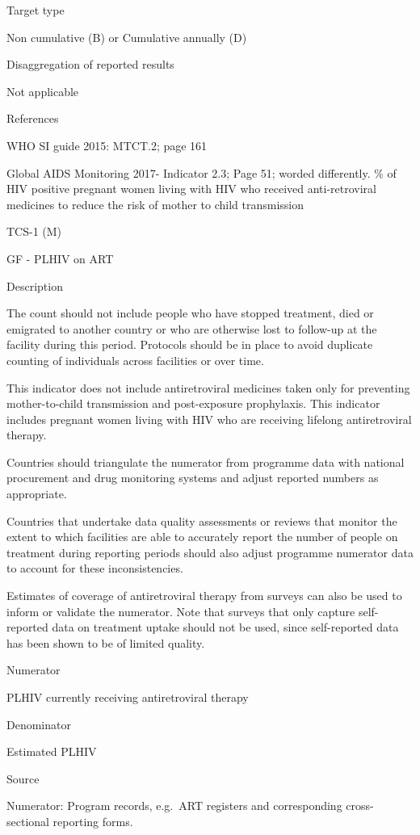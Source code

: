 \documentclass[]{book}
\begin{document}
Target type

Non cumulative (B) or Cumulative annually (D)

Disaggregation of reported results

Not applicable

References

WHO SI guide 2015: MTCT.2; page 161

Global AIDS Monitoring 2017- Indicator 2.3; Page 51; worded differently.
\% of HIV positive pregnant women living with HIV who received anti-retroviral medicines to reduce the risk of mother to child transmission

TCS-1 (M)

GF - PLHIV on ART

Description

The count should not include people who have stopped treatment, died or emigrated to another country or who are otherwise lost to follow-up at the facility during this period. Protocols should be in place to avoid duplicate counting of individuals across facilities or over time.

This indicator does not include antiretroviral medicines taken only for preventing mother-to-child transmission and post-exposure prophylaxis. This
indicator includes pregnant women living with HIV who are receiving lifelong antiretroviral therapy.

Countries should triangulate the numerator from programme data with national procurement and drug monitoring systems and adjust reported numbers as appropriate.

Countries that undertake data quality assessments or reviews that monitor the extent to which facilities are able to accurately report the number of people on treatment during reporting periods should also adjust programme numerator data to account for these inconsistencies.

Estimates of coverage of antiretroviral therapy from surveys can also be used to inform or validate the numerator. Note that surveys that only capture self-reported data on treatment uptake should not be used, since self-reported data has been shown to be of limited quality.

Numerator

PLHIV currently receiving antiretroviral therapy

Denominator

Estimated PLHIV

Source

Numerator: Program records, e.g.~ART registers and corresponding cross-sectional reporting forms.
\end{document}
